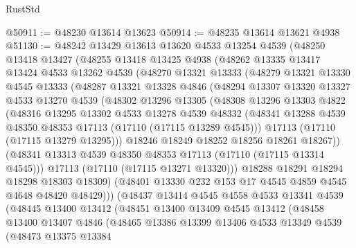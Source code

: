 \begin{lexlean}{RustStd}
\begin{coremodule}
@50911 := @48230 @13614 @13623
@50914 := @48235 @13614 @13621 @4938
@51130 := @48242
    @13429
    @13613
    @13620
    @4533
    @13254
    @4539
    (@48250
      @13418
      @13427
      (@48255
        @13418
        @13425
        @4938
        (@48262
          @13335
          @13417
          @13424
          @4533
          @13262
          @4539
          (@48270
            @13321
            @13333
            (@48279
              @13321
              @13330
              @4545
              @13333
              (@48287
                @13321
                @13328
                @4846
                (@48294
                  @13307
                  @13320
                  @13327
                  @4533
                  @13270
                  @4539
                  (@48302
                    @13296
                    @13305
                    (@48308
                      @13296
                      @13303
                      @4822
                      (@48316
                        @13295
                        @13302
                        @4533
                        @13278
                        @4539
                        @48332
                        (@48341 @13288 @4539 @48350 @48353 @17113 (@17110 (@17115 @13289 @4545)))
                        @17113
                        (@17110 (@17115 @13279 @13295)))
                      @18246
                      @18249
                      @18252
                      @18256
                      @18261
                      @18267))
                  (@48341 @13313 @4539 @48350 @48353 @17113 (@17110 (@17115 @13314 @4545)))
                  @17113
                  (@17110 (@17115 @13271 @13320)))
                @18288
                @18291
                @18294
                @18298
                @18303
                @18309)
              (@48401 @13330 @232 @153 @17 @4545 @4859 @4545 @4648 @48420 @48429)))
          (@48437
            @13414
            @4545
            @4558
            @4533
            @13341
            @4539
            (@48445
              @13400
              @13412
              (@48451
                @13400
                @13409
                @4545
                @13412
                (@48458
                  @13400
                  @13407
                  @4846
                  (@48465
                    @13386
                    @13399
                    @13406
                    @4533
                    @13349
                    @4539
                    (@48473
                      @13375
                      @13384

\end{coremodule}
\end{lexlean}
